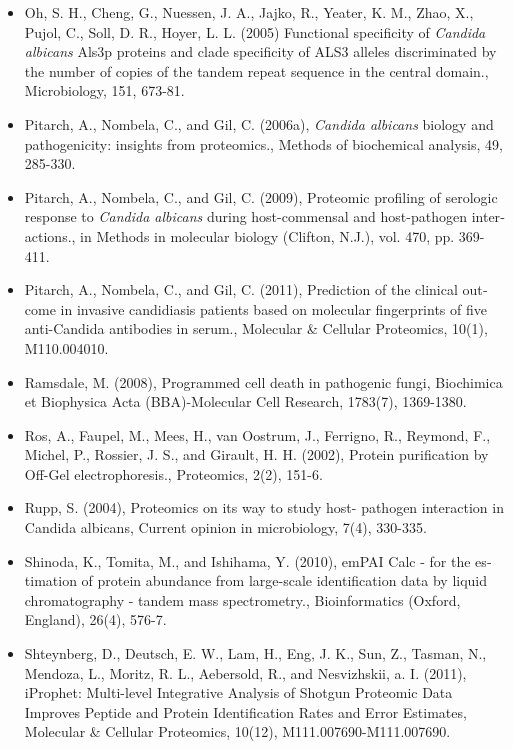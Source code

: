 \begin{otherlanguage}{british}
\begin{itemize}[leftmargin=*]
\item[]{
Oh, S. H., Cheng, G., Nuessen, J. A., Jajko, R., Yeater, K. M., Zhao, X., Pujol, C., Soll, D. R., Hoyer,  L. L. (2005)
Functional specificity of \textit{Candida albicans} Als3p proteins and clade specificity of ALS3 
alleles discriminated by the number of copies of the tandem repeat sequence in the central domain.,
Microbiology, 151, 673-81.
}

\item[]{%
Pitarch, A., Nombela, C., and Gil, C. (2006a), \textit{Candida albicans} biology and pathogenicity:
insights from proteomics., 
Methods of biochemical analysis, 49, 285-330.
}

\item[]{%
Pitarch, A., Nombela, C., and Gil, C. (2009), Proteomic profiling of serologic response to 
\textit{Candida albicans} during host-commensal and host-pathogen interactions., 
in Methods in molecular biology (Clifton, N.J.), vol. 470, pp. 369-411.
}

\item[]{%
Pitarch, A., Nombela, C., and Gil, C. (2011), Prediction of the clinical outcome in invasive 
candidiasis patients based on molecular fingerprints of five anti-Candida antibodies in serum.,
Molecular \& Cellular Proteomics, 10(1), M110.004010.
}

\item[]{%
Ramsdale, M. (2008), Programmed cell death in pathogenic fungi, Biochimica et Biophysica
Acta (BBA)-Molecular Cell Research, 1783(7), 1369-1380.
}


\item[]{%
Ros, A., Faupel, M., Mees, H., van Oostrum, J., Ferrigno, R., Reymond, F., Michel, P., Rossier,
J. S., and Girault, H. H. (2002), Protein purification by Off-Gel electrophoresis., Proteomics,
2(2), 151-6.
}

\item[]{%
Rupp, S. (2004), Proteomics on its way to study host- pathogen interaction in Candida albicans,
 Current opinion in microbiology, 7(4), 330-335.
}

\item[]{%
Shinoda, K., Tomita, M., and Ishihama, Y. (2010), 
emPAI Calc - for the estimation of protein abundance from large-scale
identification data by liquid chromatography - tandem mass spectrometry.,
Bioinformatics (Oxford, England), 26(4), 576-7.
}

\item[]{%
Shteynberg, D., Deutsch, E. W., Lam, H., Eng, J. K., Sun, Z., Tasman, N., Mendoza, L., Moritz,
R. L., Aebersold, R., and Nesvizhskii, a. I. (2011), iProphet: Multi-level Integrative Analysis
of Shotgun Proteomic Data Improves Peptide and Protein Identification Rates and Error
Estimates, Molecular \& Cellular Proteomics, 10(12), M111.007690-M111.007690.
}



\end{itemize}
\end{otherlanguage}
